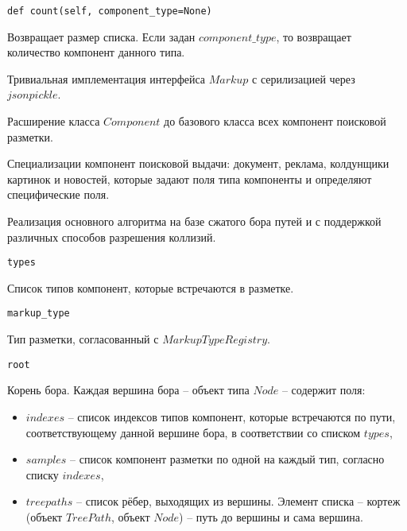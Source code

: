 \begin{lstlisting}
def count(self, component_type=None)
\end{lstlisting}
Возвращает размер списка. Если задан $component\_type$, то возвращает количество компонент данного типа.
\\


Тривиальная имплементация интерфейса $Markup$ с серилизацией через $jsonpickle$.
\\


Расширение класса $Component$ до базового класса всех компонент поисковой разметки.
\\


Специализации компонент поисковой выдачи: документ, реклама, колдунщики картинок и новостей, которые задают поля типа компоненты и определяют специфические поля.
\\


Реализация основного алгоритма на базе сжатого бора путей и с поддержкой различных способов разрешения коллизий.
\\

\begin{lstlisting}
types
\end{lstlisting}
Список типов компонент, которые встречаются в разметке.
\\

\begin{lstlisting}
markup_type
\end{lstlisting}
Тип разметки, согласованный с $MarkupTypeRegistry$.
\\

\begin{lstlisting}
root
\end{lstlisting}
Корень бора. Каждая вершина бора -- объект типа $Node$ -- содержит поля:
\begin{itemize}
	\item $indexes$ -- список индексов типов компонент, которые встречаются по пути, соответствующему данной вершине бора, в соответствии со списком $types$,
	\item $samples$ -- список компонент разметки по одной на каждый тип, согласно списку $indexes$,
	\item $treepaths$ -- список рёбер, выходящих из вершины. Элемент списка -- кортеж (объект $TreePath$, объект $Node$) -- путь до вершины и сама вершина.
\end{itemize}


